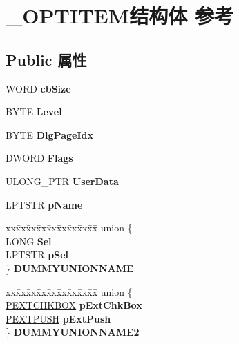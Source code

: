 \hypertarget{struct___o_p_t_i_t_e_m}{}\section{\+\_\+\+O\+P\+T\+I\+T\+E\+M结构体 参考}
\label{struct___o_p_t_i_t_e_m}
\subsection*{Public 属性}
\begin{DoxyCompactItemize}
\item 
\mbox{\label{struct___o_p_t_i_t_e_m_a4fd298f06aa32b0351cf512d93d7f2e9}} 
W\+O\+RD {\bfseries cb\+Size}
\item 
\mbox{\label{struct___o_p_t_i_t_e_m_abc334c9d88f5d001d6717465c0ac55fe}} 
B\+Y\+TE {\bfseries Level}
\item 
\mbox{\label{struct___o_p_t_i_t_e_m_a4daf54b09d46606b2286578677ed2769}} 
B\+Y\+TE {\bfseries Dlg\+Page\+Idx}
\item 
\mbox{\label{struct___o_p_t_i_t_e_m_aa1f1337fe1a5ed0e3d5c1a94d71f4ce0}} 
D\+W\+O\+RD {\bfseries Flags}
\item 
\mbox{\label{struct___o_p_t_i_t_e_m_aacc09ba6db92c4838dbb818d15d74c5d}} 
U\+L\+O\+N\+G\+\_\+\+P\+TR {\bfseries User\+Data}
\item 
\mbox{\label{struct___o_p_t_i_t_e_m_a5ef452a693e07bbf4f64e97ce6ec0d76}} 
L\+P\+T\+S\+TR {\bfseries p\+Name}
\item 
\mbox{\label{struct___o_p_t_i_t_e_m_aa519cfa5f186966845a9394ff1195ef7}} 
\begin{tabbing}
xx\=xx\=xx\=xx\=xx\=xx\=xx\=xx\=xx\=\kill
union \{\\
\>LONG {\bfseries Sel}\\
\>LPTSTR {\bfseries pSel}\\
\} {\bfseries DUMMYUNIONNAME}\\

\end{tabbing}\item 
\mbox{\label{struct___o_p_t_i_t_e_m_a0b6622d8a9102179943af8dc7e3d93be}} 
\begin{tabbing}
xx\=xx\=xx\=xx\=xx\=xx\=xx\=xx\=xx\=\kill
union \{\\
\>\hyperlink{struct___e_x_t_c_h_k_b_o_x}{PEXTCHKBOX} {\bfseries pExtChkBox}\\
\>\hyperlink{struct___e_x_t_p_u_s_h}{PEXTPUSH} {\bfseries pExtPush}\\
\} {\bfseries DUMMYUNIONNAME2}\\


\end{tabbing}
\end{DoxyCompactItemize}

